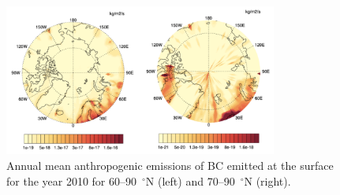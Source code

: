 \documentclass[12pt, fullpage]{uiucthesis2009}
\begin{document}
		\begin{figure}[h] 
			\begin{center}
				\includegraphics[width = 0.8\textwidth]{Figure11}
				\caption[Annual mean anthropogenic emissions of BC emitted at the surface for the year 2010 for 60--90~$^\circ$N (left) and 70--90~$^\circ$N (right)]{\label{fig_P11} Annual mean anthropogenic emissions of BC emitted at the surface for the year 2010 for 60--90~$^\circ$N (left) and 70--90~$^\circ$N (right).}
			\end{center}
		\end{figure}
		
\end{document}
